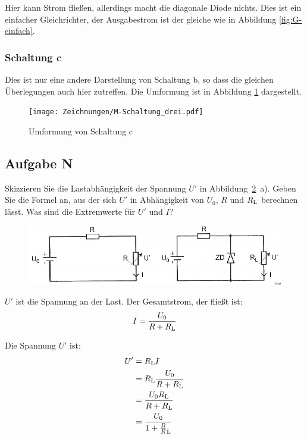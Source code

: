 Hier kann Strom fließen, allerdings macht die diagonale Diode nichts. Dies ist
ein einfacher Gleichrichter, der Ausgabestrom ist der gleiche wie in Abbildung
\ref{fig:G-einfach}.

\subsubsection{Schaltung c}

Dies ist nur eine andere Darstellung von Schaltung b, so dass die gleichen
Überlegungen auch hier zutreffen. Die Umformung ist in Abbildung
\ref{fig:M-Schaltung_drei} dargestellt.

\begin{figure}[htbp]
	\centering
	\texttt{[image: Zeichnungen/M-Schaltung\_drei.pdf]}
	\caption{%
		Umformung von Schaltung c
	}
	\label{fig:M-Schaltung_drei}
\end{figure}

\FloatBarrier
\subsection{Aufgabe N}

\begin{problem}
	Skizzieren Sie die Lastabhängigkeit der Spannung $U'$ in
	Abbildung~\ref{fig:2-11}~a). Geben Sie die Formel an, aus der sich $U'$ in
	Abhängigkeit von $U_0$, $R$ und $R_\text L$ berechnen lässt. Was sind die
	Extremwerte für $U'$ und $I$?
\end{problem}

\begin{figure}[htbp]
	\centering
	\includegraphics[width=\linewidth]{Bilder_aus_Anleitung/2-11.png}
	\caption{%
		\cite[Abbildung~2.11]{physik313-Anleitung}
	}
	\label{fig:2-11}
\end{figure}

$U'$ ist die Spannung an der Last. Der Gesamtstrom, der fließt ist:
\[
	I = \frac{U_0}{R + R_\text L}
\]

\newcommand\RL{R_\text L}

Die Spannung $U'$ ist:
\begin{align*}
	U'
	&= \RL I \\
	&= \RL \frac{U_0}{R + R_\text L} \\
	&= \frac{U_0 \RL}{R + \RL} \\
	&= \frac{U_0}{1 + \frac R\RL}
\end{align*}

